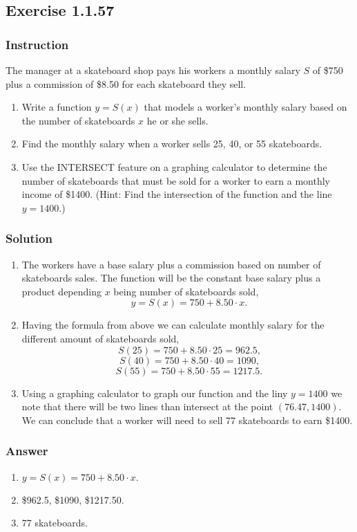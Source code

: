 \subsection*{Exercise 1.1.57}

\subsubsection*{Instruction}

The manager at a skateboard shop pays his workers a monthly salary $ S $ of \$750 plus a commission of \$8.50 for each skateboard they sell.

\begin{enumerate}[label = (\alph*)]
  \item
    Write a function $ y = S(x) $ that models a worker’s monthly salary based on the number of skateboards $ x $ he or she sells.
  \item
    Find the monthly salary when a worker sells 25, 40, or 55 skateboards.
  \item
    Use the INTERSECT feature on a graphing calculator to determine the number of skateboards that must be sold for a worker to earn a monthly income of \$1400. (Hint: Find the intersection of the function and the line $ y = 1400 $.)
\end{enumerate}

\subsubsection*{Solution}

\begin{enumerate}[label = (\alph*)]
  \item
    The workers have a base salary plus a commission based on number of skateboards sales. The function will be the constant base salary plus a product depending $ x $ being number of skateboards sold,
    $$ \phantom{.}
    y = S(x) = 750 + 8.50 \cdot x
    .$$
  \item
    Having the formula from above we can calculate monthly salary for the different amount of skateboards sold,
    $$ \phantom{,}
    S(25) = 750 + 8.50 \cdot 25 = 962.5
    ,$$
    $$ \phantom{,}
    S(40) = 750 + 8.50 \cdot 40 = 1090
    ,$$
    $$ \phantom{.}
    S(55) = 750 + 8.50 \cdot 55 = 1217.5
    .$$
  \item
    Using a graphing calculator to graph our function and the liny $ y = 1400 $ we note that there will be two lines than intersect at the point $ (76.47, 1400) $. We can conclude that a worker will need to sell 77 skateboards to earn \$1400.

\end{enumerate}

\subsubsection*{Answer}

\begin{enumerate}[label = (\alph*)]
  \item
    $ y = S(x) = 750 + 8.50 \cdot x. $
  \item
    \$962.5, \$1090, \$1217.50.
  \item
    77 skateboards.
\end{enumerate}
